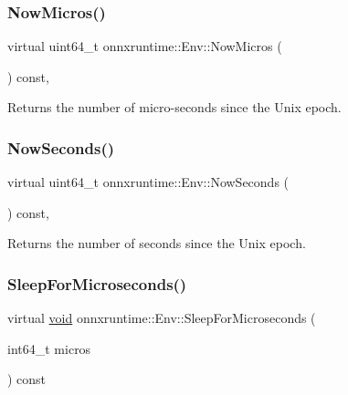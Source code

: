 \mbox{\label{classonnxruntime_1_1Env_a001849df94fd8eb65a81a70307197061}} 
\subsubsection{\texorpdfstring{Now\+Micros()}{NowMicros()}}
{\footnotesize\ttfamily virtual uint64\+\_\+t onnxruntime\+::\+Env\+::\+Now\+Micros (\begin{DoxyParamCaption}{ }\end{DoxyParamCaption}) const\hspace{0.3cm}{\ttfamily [inline]}, {\ttfamily [virtual]}}



Returns the number of micro-\/seconds since the Unix epoch. 

\mbox{\label{classonnxruntime_1_1Env_a1de6adfcff338e90b34a65803718afdf}} 
\subsubsection{\texorpdfstring{Now\+Seconds()}{NowSeconds()}}
{\footnotesize\ttfamily virtual uint64\+\_\+t onnxruntime\+::\+Env\+::\+Now\+Seconds (\begin{DoxyParamCaption}{ }\end{DoxyParamCaption}) const\hspace{0.3cm}{\ttfamily [inline]}, {\ttfamily [virtual]}}



Returns the number of seconds since the Unix epoch. 

\mbox{\label{classonnxruntime_1_1Env_a2652f151c55c07c900f1e47993e603b8}} 
\subsubsection{\texorpdfstring{Sleep\+For\+Microseconds()}{SleepForMicroseconds()}}
{\footnotesize\ttfamily virtual \mbox{\hyperlink{mlasi_8h_a88f941d423cb2a819b70a1358982b1a6}{void}} onnxruntime\+::\+Env\+::\+Sleep\+For\+Microseconds (\begin{DoxyParamCaption}\item[{int64\+\_\+t}]{micros }\end{DoxyParamCaption}) const\hspace{0.3cm}{\ttfamily [pure virtual]}}

